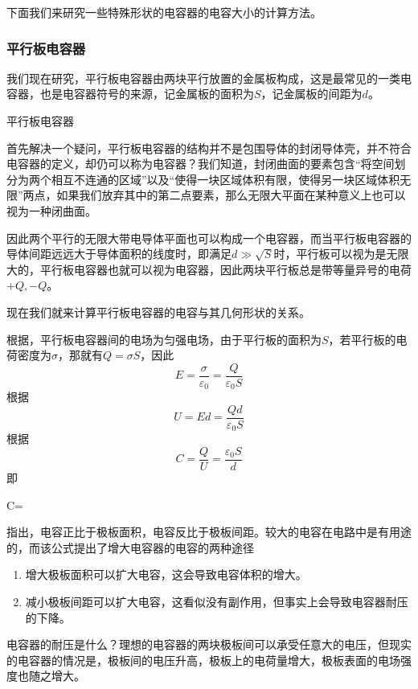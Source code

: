 下面我们来研究一些特殊形状的电容器的电容大小的计算方法。

\subsubsection{平行板电容器}
我们现在研究，平行板电容器由两块平行放置的金属板构成，这是最常见的一类电容器，也是电容器符号的来源，记金属板的面积为$S$，记金属板的间距为$d$。
\begin{Figure}{平行板电容器}
    \qquad\qquad
\end{Figure}
首先解决一个疑问，平行板电容器的结构并不是包围导体的封闭导体壳，并不符合电容器的定义，却仍可以称为电容器？我们知道，封闭曲面的要素包含“将空间划分为两个相互不连通的区域”以及“使得一块区域体积有限，使得另一块区域体积无限”两点，如果我们放弃其中的第二点要素，那么无限大平面在某种意义上也可以视为一种闭曲面。

因此两个平行的无限大带电导体平面也可以构成一个电容器，而当平行板电容器的导体间距远远大于导体面积的线度时，即满足$d\gg\sqrt{S}$时，平行板可以视为是无限大的，平行板电容器也就可以视为电容器，因此两块平行板总是带等量异号的电荷$+Q,-Q$。

现在我们就来计算平行板电容器的电容与其几何形状的关系。

根据，平行板电容器间的电场为匀强电场，由于平行板的面积为$S$，若平行板的电荷密度为$\sigma$，那就有$Q=\sigma S$，因此
\begin{equation*}
    E=\frac{\sigma}{\varepsilon_0}=\frac{Q}{\varepsilon_0S}
\end{equation*}
根据
\begin{equation*}
    U=Ed=\frac{Qd}{\varepsilon_0 S}
\end{equation*}
根据
\begin{equation*}
    C=\frac{Q}{U}=\frac{\varepsilon_0S}{d}
\end{equation*}
即
\begin{BoxEquation}[平行板电容器的电容]
    C=
\end{BoxEquation}
指出，电容正比于极板面积，电容反比于极板间距。较大的电容在电路中是有用途的，而该公式提出了增大电容器的电容的两种途径
\begin{enumerate}
    \item 增大极板面积可以扩大电容，这会导致电容体积的增大。
    \item 减小极板间距可以扩大电容，这看似没有副作用，但事实上会导致电容器耐压的下降。
\end{enumerate}
电容器的耐压是什么？理想的电容器的两块极板间可以承受任意大的电压，但现实的电容器的情况是，极板间的电压升高，极板上的电荷量增大，极板表面的电场强度也随之增大。

